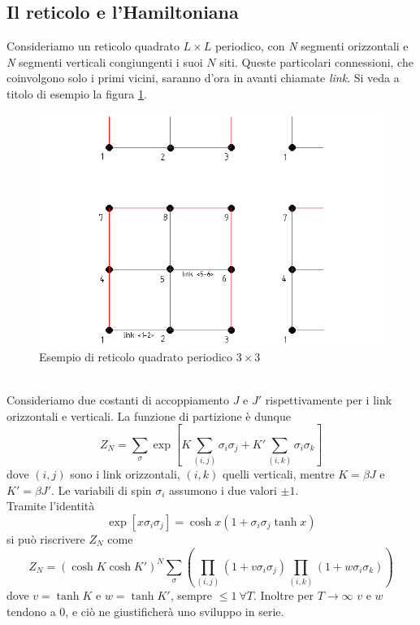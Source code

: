\documentclass[11pt]{article}
\begin{document}
\subsection{Il reticolo e l'Hamiltoniana}

Consideriamo un reticolo quadrato $L \times L$ periodico, con \emph{N} segmenti orizzontali e \emph{N} segmenti verticali congiungenti i suoi $N$ siti. Queste particolari connessioni, che coinvolgono solo i primi vicini, saranno d'ora in avanti chiamate \emph{link}. Si veda a titolo di esempio la figura \ref{reticolo3}.
\begin{figure}[h]
\centering
\includegraphics[width=0.86\columnwidth]{ret33}
\caption{Esempio di reticolo quadrato periodico $3 \times 3$ }
\label{reticolo3}
\end{figure}
\\Consideriamo due costanti di accoppiamento $J$ e $J'$ rispettivamente per i link orizzontali e verticali. La funzione di partizione è dunque
\begin{equation} \label{z}
Z_N=\sum_\sigma \exp \left[ K\sum_{(i,j)}\sigma_i\sigma_j+K'\sum_{(i,k)}\sigma_i\sigma_k \right]
\end{equation}
dove $(i,j)$ sono i link orizzontali, $(i,k)$ quelli verticali, mentre $K=\beta J$ e $K'=\beta J'$. Le variabili di spin $\sigma_i$ assumono i due valori $\pm1$.\\
Tramite l'identità
$$\exp[x\sigma_i\sigma_j]=\cosh{x}(1+\sigma_i\sigma_j\tanh{x})$$
si può riscrivere $Z_N$ come
\begin{equation}\label{z2}
Z_N=(\cosh{K}\cosh{K'})^N\sum_{\sigma}\left(\prod_{(i,j)}(1+v\sigma_i\sigma_j)\prod_{(i,k)}(1+w\sigma_i\sigma_k)\right) 
\end{equation}
dove $v=\tanh{K}$ e $w=\tanh{K'}$, sempre $\le1 \ \forall T $. Inoltre per $T\to\infty$ $v$ e $w$ tendono a $0$, e ciò ne giustificherà uno sviluppo in serie.
\end{document}

